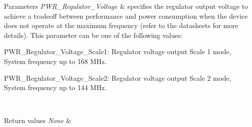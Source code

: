 \begin{DoxyParams}{Parameters}
{\em P\+W\+R\+\_\+\+Regulator\+\_\+\+Voltage} & specifies the regulator output voltage to achieve a tradeoff between performance and power consumption when the device does not operate at the maximum frequency (refer to the datasheets for more details). This parameter can be one of the following values\+: \begin{DoxyItemize}
\item P\+W\+R\+\_\+\+Regulator\+\_\+\+Voltage\+\_\+\+Scale1\+: Regulator voltage output Scale 1 mode, System frequency up to 168 M\+Hz. \item P\+W\+R\+\_\+\+Regulator\+\_\+\+Voltage\+\_\+\+Scale2\+: Regulator voltage output Scale 2 mode, System frequency up to 144 M\+Hz. \end{DoxyItemize}
\\
\hline
\end{DoxyParams}

\begin{DoxyRetVals}{Return values}
{\em None} & \\
\hline
\end{DoxyRetVals}
